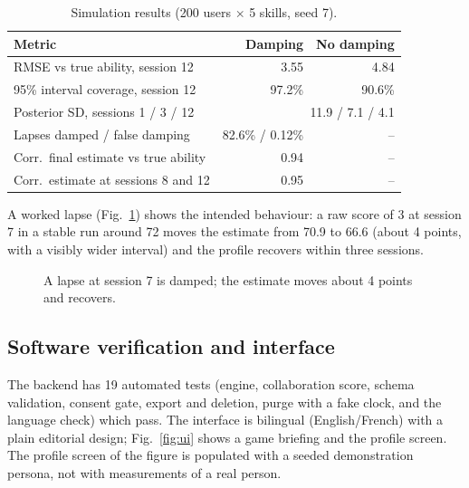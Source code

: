 \documentclass[conference]{IEEEtran}
\begin{document}
\begin{table}[t]
\caption{Simulation results (200 users $\times$ 5 skills, seed 7).}
\label{tab:res}
\centering\footnotesize
\begin{tabular}{@{}lrr@{}}
\toprule
Metric & Damping & No damping\\
\midrule
RMSE vs true ability, session 12 & 3.55 & 4.84\\
95\% interval coverage, session 12 & 97.2\% & 90.6\%\\
Posterior SD, sessions 1 / 3 / 12 & \multicolumn{2}{r}{11.9 / 7.1 / 4.1}\\
Lapses damped / false damping & 82.6\% / 0.12\% & --\\
Corr.\ final estimate vs true ability & 0.94 & --\\
Corr.\ estimate at sessions 8 and 12 & 0.95 & --\\
\bottomrule
\end{tabular}
\end{table}

A worked lapse (Fig.~\ref{fig:lapse}) shows the intended behaviour: a raw score of 3 at session 7 in a stable run around 72 moves the estimate from 70.9 to 66.6 (about 4 points, with a visibly wider interval) and the profile recovers within three sessions.

\begin{figure}[t]
\centering
{}
\caption{A lapse at session 7 is damped; the estimate moves about 4 points and recovers.}
\label{fig:lapse}
\end{figure}

\subsection{Software verification and interface}
The backend has 19 automated tests (engine, collaboration score, schema validation, consent gate, export and deletion, purge with a fake clock, and the language check) which pass. The interface is bilingual (English/French) with a plain editorial design; Fig.~\ref{fig:ui} shows a game briefing and the profile screen. The profile screen of the figure is populated with a seeded demonstration persona, not with measurements of a real person.
\end{document}
